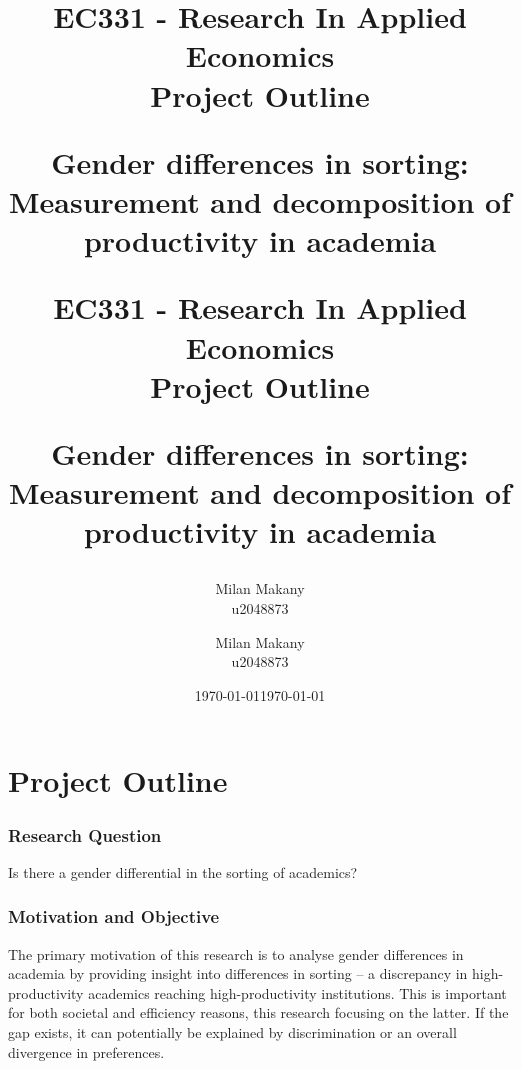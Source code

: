 \documentclass[10pt]{report}
\begin{document}
\title{EC331 - Research In Applied Economics \\ 
Project Outline
\vspace{150pt}

{Gender differences in sorting: Measurement and decomposition of productivity in academia} \\

\vspace{150pt}
}
\author{Milan Makany \\
u2048873}
\date{\today}

\maketitle\title{EC331 - Research In Applied Economics \\ 
Project Outline
\vspace{150pt}

{Gender differences in sorting: Measurement and decomposition of productivity in academia} \\

\vspace{150pt}
}
\author{Milan Makany \\
u2048873}
\date{\today}

\maketitle

\justify 
\section*{Project Outline}



\subsubsection*{Research Question}

Is there a gender differential in the sorting of academics?

\subsubsection*{Motivation and Objective}
The primary motivation of this research is to analyse gender differences in academia by providing insight into differences in sorting -- a discrepancy in high-productivity academics reaching high-productivity institutions. This is important for both societal and efficiency reasons, this research focusing on the latter. If the gap exists, it can potentially be explained by discrimination or an overall divergence in preferences.
\end{document}
